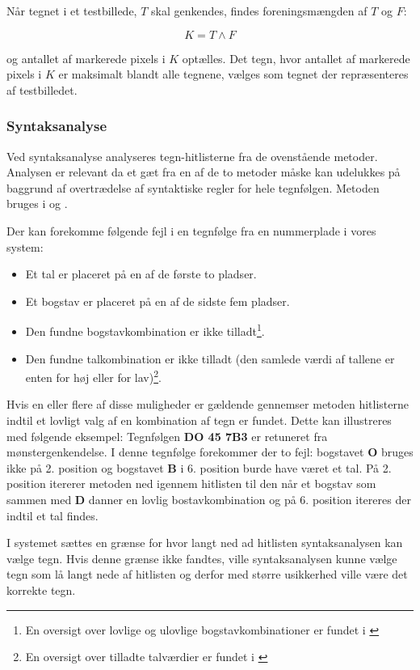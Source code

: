 Når tegnet i et testbillede, $T$ skal genkendes, findes foreningsmængden af $T$ og $F$:

\begin{displaymath}
K = T \wedge F
\end{displaymath}

og antallet af markerede pixels i $K$ optælles. Det tegn, hvor antallet af markerede pixels i $K$ er maksimalt blandt alle tegnene, vælges som tegnet der repræsenteres af testbilledet.

\subsubsection*{Syntaksanalyse}

Ved syntaksanalyse analyseres tegn-hitlisterne fra de ovenstående metoder. Analysen er relevant da et gæt fra en af de to metoder måske kan udelukkes på baggrund af overtrædelse af syntaktiske regler for hele tegnfølgen. Metoden bruges i \cite{nijhuis} og \cite{kwas}.

Der kan forekomme følgende fejl i en tegnfølge fra en nummerplade i vores system:

\begin{itemize}
\item Et tal er placeret på en af de første to pladser.
\item Et bogstav er placeret på en af de sidste fem pladser.
\item Den fundne bogstavkombination er ikke tilladt\footnote{En oversigt over lovlige og ulovlige bogstavkombinationer er fundet i \cite{bogstav_komb}}.
\item Den fundne talkombination er ikke tilladt (den samlede værdi af tallene er enten for høj eller for lav)\footnote{En oversigt over tilladte talværdier er fundet i \cite{nrpl}}.
\end{itemize}

Hvis en eller flere af disse muligheder er gældende gennemser metoden hitlisterne indtil et lovligt valg af en kombination af tegn er fundet. Dette kan illustreres med følgende eksempel: Tegnfølgen \textbf{DO 45 7B3} er retuneret fra mønstergenkendelse. I denne tegnfølge forekommer der to fejl: bogstavet \textbf{O} bruges ikke på 2. position og bogstavet \textbf{B} i 6. position burde have været et tal. På 2. position itererer metoden ned igennem hitlisten til den når et bogstav som sammen med \textbf{D} danner en lovlig bostavkombination og på 6. position itereres der indtil et tal findes.

I systemet sættes en grænse for hvor langt ned ad hitlisten syntaksanalysen kan vælge tegn. Hvis denne grænse ikke fandtes, ville syntaksanalysen kunne vælge tegn som lå langt nede af hitlisten og derfor med større usikkerhed ville være det korrekte tegn.

